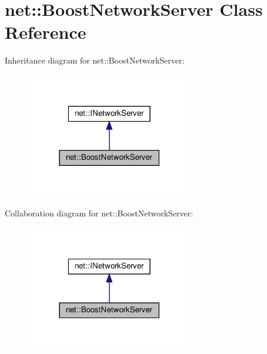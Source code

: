 \hypertarget{classnet_1_1BoostNetworkServer}{}\section{net\+:\+:Boost\+Network\+Server Class Reference}
\label{classnet_1_1BoostNetworkServer}


Inheritance diagram for net\+:\+:Boost\+Network\+Server\+:
\nopagebreak
\begin{figure}[H]
\begin{center}
\leavevmode
\includegraphics[width=207pt]{classnet_1_1BoostNetworkServer__inherit__graph}
\end{center}
\end{figure}


Collaboration diagram for net\+:\+:Boost\+Network\+Server\+:
\nopagebreak
\begin{figure}[H]
\begin{center}
\leavevmode
\includegraphics[width=207pt]{classnet_1_1BoostNetworkServer__coll__graph}
\end{center}
\end{figure}
